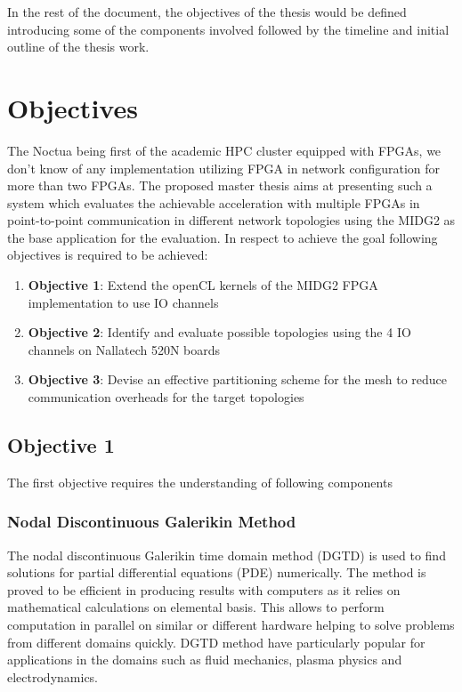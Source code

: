 \documentclass[english,notitlepage]{hgbreport}
\begin{document}
In the rest of the document, the objectives of the thesis would be defined introducing some of the components involved followed
by the timeline and initial outline of the thesis work.


\section{Objectives}

The Noctua being first of the academic HPC cluster equipped with FPGAs, we don't know of any implementation
utilizing FPGA in network configuration for more than two FPGAs. The proposed master thesis aims at presenting
such a system which evaluates the achievable acceleration with multiple FPGAs in point-to-point communication
in different network topologies using the MIDG2 as the base application for the evaluation. In respect to achieve
the goal following objectives is required to be achieved:

\begin{enumerate}
	\item \textbf{Objective 1}: Extend the openCL kernels of the MIDG2 FPGA implementation to use IO channels
	\item \textbf{Objective 2}: Identify and evaluate possible topologies using the 4 IO channels on Nallatech 520N boards
	\item \textbf{Objective 3}: Devise an effective partitioning scheme for the mesh to reduce communication overheads for the target topologies
\end{enumerate}

\subsection{Objective 1}

The first objective requires the understanding of following components

\subsubsection{Nodal Discontinuous Galerikin Method}	%

The nodal discontinuous Galerikin time domain method (DGTD) \cite{hesthaven_nodal_2008} is used to find solutions
for partial differential equations (PDE) numerically. The method is proved to be efficient in
producing results with computers as it relies on mathematical calculations on elemental basis.
This allows to perform computation in parallel on similar or different hardware helping to
solve problems from different domains quickly. DGTD method have particularly popular for applications
in the domains such as fluid mechanics, plasma physics and electrodynamics.
\end{document}
